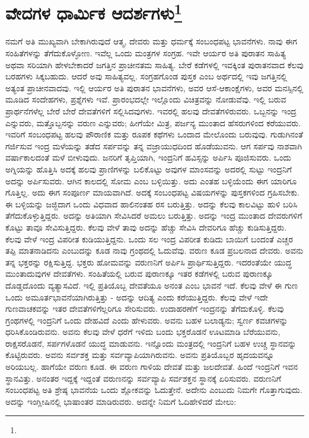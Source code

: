 
\chapter[ವೇದಗಳ ಧಾರ್ಮಿಕ ಆದರ್ಶಗಳು]{ವೇದಗಳ ಧಾರ್ಮಿಕ ಆದರ್ಶಗಳು\protect\footnote{}}

ನಮಗೆ ಅತಿ ಮುಖ್ಯವಾಗಿ ಬೇಕಾಗಿರುವುದೆ ಆತ್ಮ, ದೇವರು ಮತ್ತು ಧರ್ಮಕ್ಕೆ ಸಂಬಂಧಪಟ್ಟ ಭಾವನೆಗಳು. ನಾವು ಈಗ ಸಂಹಿತೆಗಳನ್ನು ತೆಗೆದುಕೊಳ್ಳೋಣ. ಇವೆಲ್ಲ ಒಂದು ಮಂತ್ರಗಳ ಸಂಗ್ರಹ. ಇವೇ ಆರ್ಯರ ಅತಿ ಪುರಾತನ ಸಾಹಿತ್ಯ ಅಥವಾ ಸರಿಯಾಗಿ ಹೇಳಬೇಕಾದರೆ ಜಗತ್ತಿನ ಪ್ರಾಚೀನತಮ ಸಾಹಿತ್ಯ. ಬೇರೆ ಕಡೆಗಳಲ್ಲಿ ಇವಕ್ಕಿಂತ ಪುರಾತನವಾದ ಕೆಲವು ಬರಹಗಳು ಸಿಕ್ಕಬಹುದು. ಆದರೆ ಅವು ಸಾಹಿತ್ಯವಲ್ಲ. ಸಂಗ್ರಹಗೊಂಡ ಪುಸ್ತಕ ಎಂಬ ಅರ್ಥದಲ್ಲಿ ಇವು ಜಗತ್ತಿನಲ್ಲಿ ಅತ್ಯಂತ ಪ್ರಾಚೀನವಾದವು. ಇಲ್ಲಿ ಆರ್ಯರ ಅತಿ ಪುರಾತನ ಭಾವನೆಗಳು, ಅವರ ಆಸೆ-ಆಕಾಂಕ್ಷೆಗಳು, ಅವರ ಮನಸ್ಸಿನಲ್ಲಿ ಮೂಡಿದ ಸಂದೇಹಗಳು, ಪ್ರಶ್ನೆಗಳು ಇವೆ. ಪ್ರಾರಂಭದಲ್ಲೇ ಇಲ್ಲೊಂದು ವಿಚಿತ್ರವನ್ನು ನೋಡುವೆವು. ಇಲ್ಲಿ ಬರುವ ಪ್ರಾರ್ಥನೆಗಳೆಲ್ಲ ಬೇರೆ ಬೇರೆ ದೇವತೆಗಳಿಗೆ ಸಲ್ಲಿಸಿದವುಗಳು. ಇವರಲ್ಲಿ ಹಲವು ದೇವತೆಗಳಿರುವರು. ಒಬ್ಬನನ್ನು ಇಂದ್ರ ಎನ್ನುವರು, ಮತ್ತೊಬ್ಬನನ್ನು ವರುಣ ಎನ್ನುವರು; ಹೀಗೆಯೇ ಮಿತ್ರ, ಪರ್ಜನ್ಯ ಮುಂತಾದ ಹೆಸರುಗಳಿಂದ ಕರೆಯುವರು. ಇವರಿಗೆ ಸಂಬಂಧಪಟ್ಟ ಹಲವು ಪೌರಾಣಿಕ ಮತ್ತು ರೂಪಕ ಕಥೆಗಳು ಒಂದಾದ ಮೇಲೊಂದು ಬರುವುವು. ಗುಡುಗಿನಂತೆ ಗರ್ಜಿಸುವ ಇಂದ್ರ ಮಳೆಯನ್ನು ತಡೆದ ಸರ್ಪವನ್ನು ತನ್ನ ವಜ್ರಾಯುಧದಿಂದ ಹೊಡೆಯುವನು. ಆಗ ಸರ್ಪವು ನಾಶವಾಗಿ ವರ್ಷಾಕಾಲದಂತೆ ಮಳೆ ಬೀಳುವುದು. ಜನರಿಗೆ ತೃಪ್ತಿಯಾಗಿ, ಇಂದ್ರನಿಗೆ ಹವಿಸ್ಸನ್ನು ಅರ್ಪಿಸಿ ಪೂಜಿಸುವರು. ಒಂದು ಅಗ್ನಿಯನ್ನು ಹೊತ್ತಿಸಿ ಅದಕ್ಕೆ ಹಲವು ಪ್ರಾಣಿಗಳನ್ನು ಬಲಿಕೊಟ್ಟು ಅವುಗಳ ಮಾಂಸವನ್ನು ಅದರಲ್ಲಿ ಸುಟ್ಟು ಇಂದ್ರನಿಗೆ ಅದನ್ನು ಅರ್ಪಿಸುವರು. ಆಗಿನ ಕಾಲದಲ್ಲಿ ಸೋಮ ಎಂಬ ಬಳ್ಳಿಯಿತ್ತು. ಅದು ಎಂತಹ ಬಳ್ಳಿಯೆಂದು ಈಗ ಯಾರಿಗೂ ಗೊತ್ತಿಲ್ಲ. ಅದು ಈಗ ಸಂಪೂರ್ಣ ಮಾಯವಾಗಿದೆ. ಅದಕ್ಕೆ ಸಂಬಂಧಪಟ್ಟ ವಿಷಯಗಳನ್ನು ಪುಸ್ತಕಗಳಿಂದ ಗ್ರಹಿಸಬೇಕು. ಈ ಬಳ್ಳಿಯನ್ನು ಜಜ್ಜಿದಾಗ ಒಂದು ವಿಧವಾದ ಹಾಲಿನಂತಹ ರಸ ಬರುತ್ತಿತ್ತು. ಅದನ್ನು ಕೆಲವು ಕಾಲವಿಟ್ಟು ಹುಳಿ ಬರಿಸಿ ತೆಗೆದುಕೊಳ್ಳುತ್ತಿದ್ದರು. ಅದನ್ನು ಅತಿಯಾಗಿ ಸೇವಿಸಿದರೆ ಅಮಲು ಬರುತ್ತಿತ್ತು. ಅದನ್ನು ಇಂದ್ರ ಮುಂತಾದ ದೇವರುಗಳಿಗೆ ಕೊಟ್ಟು ತಾವೂ ಸೇವಿಸುತ್ತಿದ್ದರು. ಕೆಲವು ವೇಳೆ ತಾವು ಅದನ್ನು ಹೆಚ್ಚು ಸೇವಿಸಿ ದೇವರಿಗೂ ಹೆಚ್ಚು ಕುಡಿಸುತ್ತಿದ್ದರು. ಕೆಲವು ವೇಳೆ ಇಂದ್ರ ವಿಪರೀತ ಕುಡಿಯುತ್ತಿದ್ದನು. ಒಂದು ಸಲ ಇಂದ್ರ ವಿಪರೀತ ಕುಡಿದು ಬಾಯಿಗೆ ಬಂದಂತೆ ಎಚ್ಚರ ತಪ್ಪಿ ಮಾತನಾಡಿದನು ಎಂಬುದನ್ನು ಕೂಡ ನಾವು ಗ್ರಂಥದಲ್ಲಿ ಓದುವೆವು. ವರುಣ ಕೂಡ ಪ್ರಬಲನಾದ ದೇವರು. ಅವನು ತನ್ನ ಭಕ್ತರನ್ನು ರಕ್ಷಿಸುತ್ತಿದ್ದ. ಭಕ್ತರು ಹೋಮವನ್ನು ವರುಣನಿಗೆ ಅರ್ಪಿಸಿ ಪ್ರಾರ್ಥಿಸುತ್ತಿದ್ದರು. ಇದರಂತೆಯೇ ಯುದ್ಧ ಮುಂತಾದುವುಗಳ ದೇವತೆಗಳು. ಸಂಹಿತೆಯಲ್ಲಿ ಬರುವ ಪುರಾಣಕ್ಕೂ ಇತರ ಕಡೆಗಳಲ್ಲಿ ಬರುವ ಪುರಾಣಕ್ಕೂ ದೊಡ್ಡದೊಂದು ವ್ಯತ್ಯಾಸವಿದೆ. ಇಲ್ಲಿ ಪ್ರತಿಯೊಬ್ಬ ದೇವತೆಯೂ ಅನಂತ ಎಂಬ ಭಾವನೆ ಇದೆ. ಕೆಲವು ವೇಳೆ ಈ ಗುಣ ಒಂದು ಅಮೂರ್ತಭಾವನೆಯಾಗಿರುತ್ತಿತ್ತು - ಅದನ್ನು ಆದಿತ್ಯ ಎಂದು ಕರೆಯುತ್ತಿದ್ದರು. ಕೆಲವು ವೇಳೆ ಇದೇ ಗುಣವಾಚಕವನ್ನು ಇತರ ದೇವತೆಗಳಿಗೆಲ್ಲರಿಗೂ ಸೇರಿಸುವರು. ಉದಾಹರಣೆಗೆ ಇಂದ್ರನನ್ನು ತೆಗೆದುಕೊಳ್ಳಿ. ಕೆಲವು ಗ್ರಂಥಗಳಲ್ಲಿ ಇಂದ್ರನಿಗೆ ಒಂದು ದೇಹವಿದೆ ಎಂದು ಹೇಳುವರು. ಅವನು ಬಹಳ ಬಲಾಡ್ಯನು; ಸ್ವರ್ಣ ಕವಚಗಳನ್ನು ಧರಿಸಿಕೊಂಡಿರುವನು. ಅವನು ಕೆಲವು ವೇಳೆ ಧರೆಗೆ ಇಳಿದು ಬಂದು ಭಕ್ತರೊಡನೆ ಊಟಮಾಡಿ ಬೆರೆಯುವನು, ರಾಕ್ಷಸರೊಡನೆ, ಸರ್ಪಗಳೊಡನೆ ಯುದ್ಧ ಮಾಡುವನು. ಇನ್ನೊಂದು ಮಂತ್ರದಲ್ಲಿ ಇಂದ್ರನಿಗೆ ಬಹಳ ಉಚ್ಚ ಸ್ಥಾನವನ್ನು ಕೊಟ್ಟಿರುವರು. ಅವನು ಸರ್ವಶಕ್ತ ಮತ್ತು ಸರ್ವವ್ಯಾಪಿಯಾಗಿರುವನು. ಅವನು ಪ್ರತಿಯೊಬ್ಬರ ಹೃದಯವನ್ನೂ ಅರಿಯಬಲ್ಲ. ಹಾಗೆಯೇ ವರುಣ ಕೂಡ. ಈ ವರುಣ ಗಾಳಿಯ ದೇವತೆ ಮತ್ತು ಜಲದೇವತೆ. ಹಿಂದೆ ಇಂದ್ರನಿಗೆ ಇವನ ಸ್ಥಾನವಿತ್ತು. ಅನಂತರ ಇದ್ದಕ್ಕೆ ಇದ್ದಂತೆ ವರುಣನನ್ನು ಸರ್ವವ್ಯಾಪಿ ಸರ್ವಶಕ್ತನ ಸ್ಥಾನಕ್ಕೆ ಏರಿಸುವರು. ವರುಣನಿಗೆ ಸಂಬಂಧಪಟ್ಟ ಅತಿ ಶ್ರೇಷ್ಠ ಭಾವನೆಯ ಒಂದು ಶ್ಲೋಕವನ್ನು ಓದುತ್ತೇನೆ. ಅದೇನು ಎಂಬುದು ನಿಮಗೇ ಗೊತ್ತಾಗುವುದು. ಅದನ್ನು ಇಂಗ್ಲೀಷಿನಲ್ಲಿ ಭಾಷಾಂತರ ಮಾಡಿರುವರು. ಅದನ್ನೇ ನಿಮಗೆ ಓದಿಹೇಳಿದರೆ ಮೇಲು:

